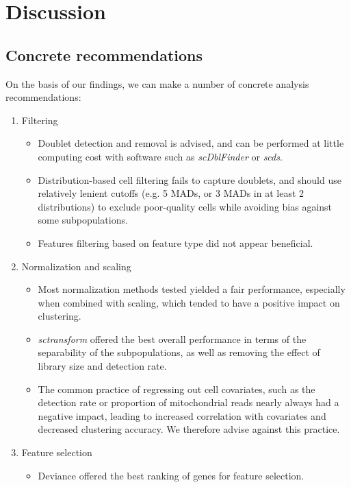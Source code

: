 \documentclass{bmcart}
\begin{document}
\section*{Discussion}

\subsection*{Concrete recommendations}

On the basis of our findings, we can make a number of concrete analysis recommendations:

\begin{enumerate}
   \item Filtering
   \begin{itemize}
     \item Doublet detection and removal is advised, and can be performed at little computing cost with software such as \textit{scDblFinder} or \textit{scds}.
     \item Distribution-based cell filtering fails to capture doublets, and should use relatively lenient cutoffs (e.g. 5 MADs, or 3 MADs in at least 2 distributions) to exclude poor-quality cells while avoiding bias against some subpopulations.
     \item Features filtering based on feature type did not appear beneficial.
   \end{itemize}
   \item Normalization and scaling
   \begin{itemize}
     \item Most normalization methods tested yielded a fair performance, especially when combined with scaling, which tended to have a positive impact on clustering.
     \item \textit{sctransform} offered the best overall performance in terms of the separability of the subpopulations, as well as removing the effect of library size and detection rate.
     \item The common practice of regressing out cell covariates, such as the detection rate or proportion of mitochondrial reads nearly always had a negative impact, leading to increased correlation with covariates and decreased clustering accuracy. We therefore advise against this practice.
   \end{itemize}
   \item Feature selection
   \begin{itemize}
     \item Deviance \citep{townesGlmpca2019} offered the best ranking of genes for feature selection.

\end{itemize}
\end{enumerate}
\end{document}
